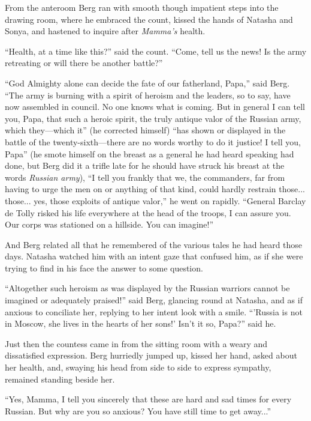 From the anteroom Berg ran with smooth though impatient steps
into the drawing room, where he embraced the count, kissed the
hands of Natasha and Sonya, and hastened to inquire after
\emph{Mamma's} health.

``Health, at a time like this?'' said the count. ``Come, tell us
the news!  Is the army retreating or will there be another
battle?''

``God Almighty alone can decide the fate of our fatherland,
Papa,'' said Berg. ``The army is burning with a spirit of heroism
and the leaders, so to say, have now assembled in council. No one
knows what is coming. But in general I can tell you, Papa, that
such a heroic spirit, the truly antique valor of the Russian
army, which they---which it'' (he corrected himself) ``has shown
or displayed in the battle of the twenty-sixth---there are no
words worthy to do it justice! I tell you, Papa'' (he smote
himself on the breast as a general he had heard speaking had
done, but Berg did it a trifle late for he should have struck his
breast at the words \emph{Russian army}), ``I tell you frankly
that we, the commanders, far from having to urge the men on or
anything of that kind, could hardly restrain
those... those... yes, those exploits of antique valor,'' he went
on rapidly. ``General Barclay de Tolly risked his life everywhere
at the head of the troops, I can assure you. Our corps was
stationed on a hillside. You can imagine!''

And Berg related all that he remembered of the various tales he
had heard those days. Natasha watched him with an intent gaze
that confused him, as if she were trying to find in his face the
answer to some question.

``Altogether such heroism as was displayed by the Russian
warriors cannot be imagined or adequately praised!'' said Berg,
glancing round at Natasha, and as if anxious to conciliate her,
replying to her intent look with a smile. ``'Russia is not in
Moscow, she lives in the hearts of her sons!' Isn't it so,
Papa?'' said he.

Just then the countess came in from the sitting room with a weary
and dissatisfied expression. Berg hurriedly jumped up, kissed her
hand, asked about her health, and, swaying his head from side to
side to express sympathy, remained standing beside her.

``Yes, Mamma, I tell you sincerely that these are hard and sad
times for every Russian. But why are you so anxious? You have
still time to get away...''

